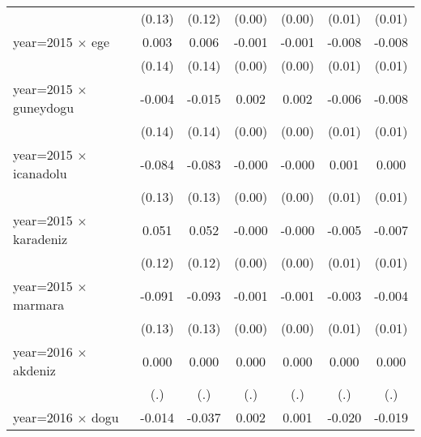 {\begin{tabular}{l*{6}{c}}
                    &      (0.13)         &      (0.12)         &      (0.00)         &      (0.00)         &      (0.01)         &      (0.01)         \\
year=2015 $\times$ ege&       0.003         &       0.006         &      -0.001         &      -0.001         &      -0.008         &      -0.008         \\
                    &      (0.14)         &      (0.14)         &      (0.00)         &      (0.00)         &      (0.01)         &      (0.01)         \\
year=2015 $\times$ guneydogu&      -0.004         &      -0.015         &       0.002         &       0.002         &      -0.006         &      -0.008         \\
                    &      (0.14)         &      (0.14)         &      (0.00)         &      (0.00)         &      (0.01)         &      (0.01)         \\
year=2015 $\times$ icanadolu&      -0.084         &      -0.083         &      -0.000         &      -0.000         &       0.001         &       0.000         \\
                    &      (0.13)         &      (0.13)         &      (0.00)         &      (0.00)         &      (0.01)         &      (0.01)         \\
year=2015 $\times$ karadeniz&       0.051         &       0.052         &      -0.000         &      -0.000         &      -0.005         &      -0.007         \\
                    &      (0.12)         &      (0.12)         &      (0.00)         &      (0.00)         &      (0.01)         &      (0.01)         \\
year=2015 $\times$ marmara&      -0.091         &      -0.093         &      -0.001         &      -0.001         &      -0.003         &      -0.004         \\
                    &      (0.13)         &      (0.13)         &      (0.00)         &      (0.00)         &      (0.01)         &      (0.01)         \\
year=2016 $\times$ akdeniz&       0.000         &       0.000         &       0.000         &       0.000         &       0.000         &       0.000         \\
                    &         (.)         &         (.)         &         (.)         &         (.)         &         (.)         &         (.)         \\
year=2016 $\times$ dogu&      -0.014         &      -0.037         &       0.002         &       0.001         &      -0.020\sym{*}  &      -0.019         \\

\end{tabular}}
